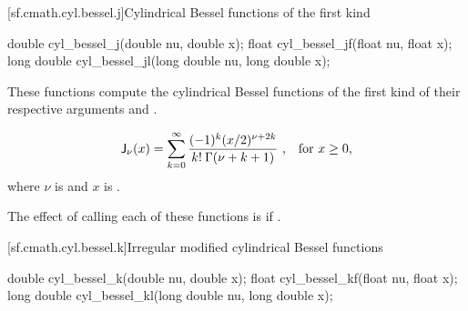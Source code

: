 [sf.cmath.cyl.bessel.j]{Cylindrical Bessel functions of the first kind}%
%
%
%
%
%
\begin{itemdecl}
double       cyl_bessel_j(double nu, double x);
float        cyl_bessel_jf(float nu, float x);
long double  cyl_bessel_jl(long double nu, long double x);
\end{itemdecl}

\begin{itemdescr}

\pnum
\effects
These functions compute
the cylindrical Bessel functions of the first kind
of their respective arguments
 and .

\pnum
\returns
\[ \mathsf{J}_\nu(x) =
   \sum_{k=0}^\infty \frac{(-1)^k (x/2)^{\nu+2k}}{k! \: \Gamma(\nu+k+1)}
   \text{ ,\quad for $x \ge 0$,} \]
where
$\nu$ is  and
$x$ is .

\pnum
\remarks
The effect of calling each of these functions
is 
if .
\end{itemdescr}

[sf.cmath.cyl.bessel.k]{Irregular modified cylindrical Bessel functions}%
%
%
%
%
%
\begin{itemdecl}
double       cyl_bessel_k(double nu, double x);
float        cyl_bessel_kf(float nu, float x);
long double  cyl_bessel_kl(long double nu, long double x);
\end{itemdecl}

